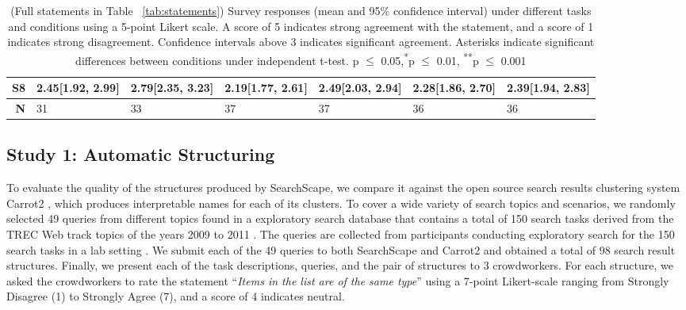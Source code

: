 \begin{table}
\begin{tabular}{r | l l | l l | l l}
        \hline
        
        S8 &
        \textbf{2.45}[1.92, 2.99] & 2.79[2.35, 3.23]&
        \textbf{2.19}[1.77, 2.61]& 2.49[2.03, 2.94]&
        \textbf{2.28}[1.86, 2.70] & 2.39[1.94, 2.83] \\
        \hline
        
        \textbf{N} & 31 & 33 & 37 & 37 & 36 & 36 \\
        

        
    \end{tabular}
    \caption[Survey responses under different tasks and conditions.]{(Full statements in Table~ \ref{tab:statements}) Survey responses (mean and 95\% confidence interval) under different tasks and conditions using a 5-point Likert scale. A score of 5 indicates strong agreement with the statement, and a score of 1 indicates strong disagreement. Confidence intervals above 3 indicates significant agreement. Asterisks indicate significant differences between conditions under independent t-test.  \textsuperscript{\tiny *}p $\boldsymbol \le$ 0.05,\textsuperscript{\tiny **}p $\boldsymbol \le$ 0.01, \textsuperscript{\tiny ***}p $\boldsymbol \le$ 0.001}
    \label{tab:survey}
\end{table}



\subsection{Study 1: Automatic Structuring}

To evaluate the quality of the structures produced by SearchScape, we compare it against the open source search results clustering system Carrot2 \cite{stefanowski2003carrot}, which produces interpretable names for each of its clusters. To cover a wide variety of search topics and scenarios, we randomly selected 49 queries from different topics found in a exploratory search database that contains a total of 150 search tasks derived from
the TREC Web track topics of the years 2009 to 2011 \cite{Hagen:2016:WSA:2854946.2854969}. The queries are collected from participants conducting exploratory search for the 150 search tasks in a lab setting \cite{potthast2013exploratory}. We submit each of the 49 queries to both SearchScape and Carrot2 and obtained a total of 98 search result structures. Finally, we present each of the task descriptions, queries, and the pair of structures to 3 crowdworkers. For each structure, we asked the crowdworkers to rate the statement ``\emph{Items in the list are of the same type}'' using a 7-point Likert-scale ranging from Strongly Disagree (1) to Strongly Agree (7), and a score of 4 indicates neutral.

